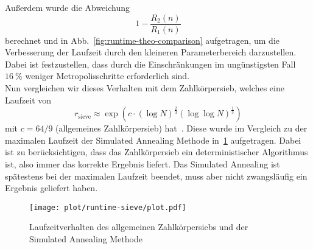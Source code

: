 Außerdem wurde die Abweichung
\begin{equation*}
		1-\frac{R_2\left(n\right)}{R_1\left(n\right)}
\end{equation*}
berechnet und in Abb.~\ref{fig:runtime-theo-comparison} aufgetragen, um die Verbesserung der Laufzeit durch den kleineren Parameterbereich darzustellen. Dabei ist festzustellen, dass durch die Einschränkungen im ungünstigsten Fall $\SI{16}{\percent}$ weniger Metropolisschritte erforderlich sind. \\
Nun vergleichen wir dieses Verhalten mit dem Zahlkörpersieb, welches eine Laufzeit von 
\begin{equation}
		r_\mathrm{sieve}\approx\exp\left(c\cdot{\left(\log N\right)}^\frac{2}{3}{\left(\log\log N\right)}^\frac{1}{3}\right)\label{eq:runtime-sieve}
\end{equation}
mit $c=64/9$ (allgemeines Zahlkörpersieb) hat~\parencite{pomerance}. Diese wurde im Vergleich zu der maximalen Laufzeit der Simulated Annealing Methode in~\ref{fig:runtime-sieve} aufgetragen. Dabei ist zu berücksichtigen, dass das Zahlkörpersieb ein deterministischer Algorithmus ist, also immer das korrekte Ergebnis liefert. Das Simulated Annealing ist spätestens bei der maximalen Laufzeit beendet, muss aber nicht zwangsläufig ein Ergebnis geliefert haben.

\begin{figure}[!ht]
		\centering
		\texttt{[image: plot/runtime-sieve/plot.pdf]}
		\caption{Laufzeitverhalten des allgemeinen Zahlkörpersiebs und der Simulated Annealing Methode}\label{fig:runtime-sieve}
\end{figure}
